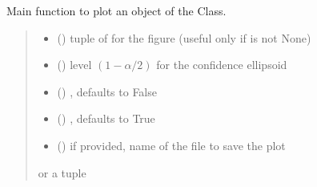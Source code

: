 \documentclass[letterpaper,10pt,english]{sphinxmanual}
\begin{document}
\begin{fulllineitems}
\begin{fulllineitems}
\label{\detokenize{cubmods:cubmods.cube.CUBresCUBE.plot}}
\pysigstartsignatures
{}
\pysigstopsignatures
\sphinxAtStartPar
Main function to plot an object of the Class.
\begin{quote}\begin{description}
\begin{itemize}
\item {} 
\sphinxAtStartPar
{} () \textendash{} tuple of  for the figure (useful only if  is not None)

\item {} 
\sphinxAtStartPar
{} () \textendash{} level \((1-\alpha/2)\) for the confidence ellipsoid

\item {} 
\sphinxAtStartPar
{} () \textendash{} , defaults to False

\item {} 
\sphinxAtStartPar
{} () \textendash{} , defaults to True

\item {} 
\sphinxAtStartPar
{} () \textendash{} if provided, name of the file to save the plot

\end{itemize}

\sphinxAtStartPar
{} or a tuple 


\end{description}
\end{quote}
\end{fulllineitems}
\end{fulllineitems}
\end{document}
